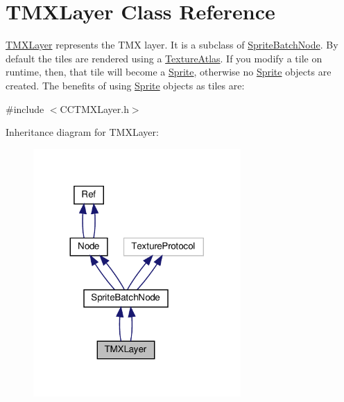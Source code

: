\hypertarget{classTMXLayer}{}\section{T\+M\+X\+Layer Class Reference}
\label{classTMXLayer}


\hyperlink{classTMXLayer}{T\+M\+X\+Layer} represents the T\+MX layer. It is a subclass of \hyperlink{classSpriteBatchNode}{Sprite\+Batch\+Node}. By default the tiles are rendered using a \hyperlink{classTextureAtlas}{Texture\+Atlas}. If you modify a tile on runtime, then, that tile will become a \hyperlink{classSprite}{Sprite}, otherwise no \hyperlink{classSprite}{Sprite} objects are created. The benefits of using \hyperlink{classSprite}{Sprite} objects as tiles are\+:  




{\ttfamily \#include $<$C\+C\+T\+M\+X\+Layer.\+h$>$}



Inheritance diagram for T\+M\+X\+Layer\+:
\nopagebreak
\begin{figure}[H]
\begin{center}
\leavevmode
\includegraphics[width=224pt]{classTMXLayer__inherit__graph}
\end{center}
\end{figure}


